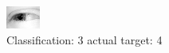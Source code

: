 \begin{figure}[h!]
\begin{center}
\includegraphics[width=0.60\columnwidth]{figures/ID2539_class_3_target_4.png}
\end{center}
\caption{ Classification: 3 actual target: 4}
\label{fig:ID2539_class_3_target_4}
\end{figure}
